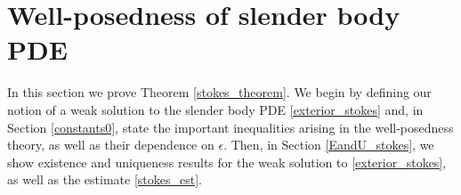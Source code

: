 \documentclass[11pt]{article}
\numberwithin{equation}{section}
\theoremstyle{definition}
\begin{document}

\section{Well-posedness of slender body PDE}\label{PDE_stokes}
In this section we prove Theorem \ref{stokes_theorem}. We begin by defining our notion of a weak solution to the slender body PDE \eqref{exterior_stokes} and, in Section \ref{constants0}, state the important inequalities arising in the well-posedness theory, as well as their dependence on $\epsilon$. Then, in Section \ref{EandU_stokes}, we show existence and uniqueness results for the weak solution to \eqref{exterior_stokes}, as well as the estimate \eqref{stokes_est}. \\
\end{document}
